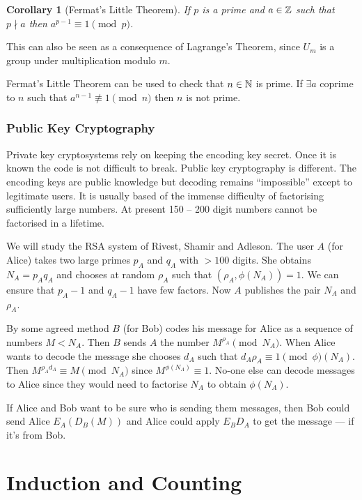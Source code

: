 \documentclass{notes}
\theoremstyle{plain}
\newtheorem*{corollary}{Corollary}
\newcommand{\nequiv}{\not\equiv}
\begin{document}
\begin{corollary}[Fermat's Little Theorem]
If $p$ is a prime and $a \in \mathbb{Z}$ such that $p \nmid a$ then
$a^{p-1} \equiv 1 \pmod{p}$.
\end{corollary}

This can also be seen as a consequence of Lagrange's Theorem, since
$U_m$ is a group under multiplication modulo $m$.

Fermat's Little Theorem can be used to check that $n \in \mathbb{N}$ is prime.  If
$\exists a$ coprime to $n$ such that $a^{n-1} \nequiv 1 \pmod{n}$ then
$n$ is not prime.

\subsection{Public Key Cryptography}

Private key cryptosystems rely on keeping the encoding key secret.  Once
it is known the code is not difficult to break.  Public key cryptography
is different.  The encoding keys are public knowledge but decoding remains
``impossible'' except to legitimate users.  It is usually based of the immense
difficulty of factorising sufficiently large numbers.  At present
150 -- 200 digit numbers cannot be factorised in a lifetime.

We will study the RSA system of Rivest, Shamir and Adleson.  The user $A$
(for Alice) takes two large primes $p_A$ and $q_A$ with $> 100$ digits.
She obtains $N_A = p_A q_A$ and chooses at random $\rho_A$ such that
$(\rho_A, \phi(N_A)) = 1$.  We can ensure that $p_A - 1$ and $q_A - 1$ have
few factors.  Now $A$ publishes the pair $N_A$ and $\rho_A$.

By some agreed method $B$ (for Bob) codes his message for Alice as a sequence
of numbers $M < N_A$.  Then $B$ sends $A$ the number $M^{\rho_A} \pmod{N_A}$.
When Alice wants to decode the message she chooses $d_A$ such that
$d_A \rho_A \equiv 1 \pmod \phi(N_A)$.  Then $M^{\rho_A d_A} \equiv M
\pmod{N_A}$ since $M^{\phi(N_A)} \equiv 1$.  No-one else can decode
messages to Alice since they would need to factorise $N_A$ to obtain
$\phi(N_A)$.

If Alice and Bob want to be sure who is sending them messages, then
Bob could send Alice $E_A(D_B(M))$ and Alice could apply
$E_B D_A$ to get the message --- if it's from Bob.

\chapter{Induction and Counting}
\end{document}

